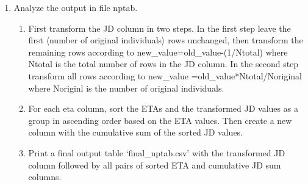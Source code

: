 \begin{enumerate}
\item Analyze the output in file nptab. 
	\begin{enumerate}
		\item First transform the JD column in two steps. In the first step leave the first $\langle$number of original individuals$\rangle$ rows unchanged, 
		then transform the remaining rows according to new\_value=old\_value-(1/Ntotal) where Ntotal is the total number of rows in the JD column. 
		In the second step transform all rows according to new\_value =old\_value*Ntotal/Noriginal where Noriginl is the number of original individuals.
		\item For each eta column,  sort the ETAs and the transformed JD values as a group in ascending order based on the ETA values. Then create a 
		new column with the cumulative sum of the sorted JD values.
		\item Print a final output table ‘final\_nptab.csv’ with the transformed JD column followed by all pairs of sorted ETA and cumulative  JD sum columns.
	\end{enumerate}
\end{enumerate}



